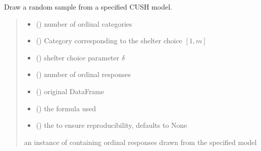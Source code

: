 \documentclass[letterpaper,10pt,english]{sphinxmanual}
\begin{document}
\begin{fulllineitems}
\label{\detokenize{cubmods:cubmods.cush.draw}}
\pysigstartsignatures
{}
\pysigstopsignatures
\sphinxAtStartPar
Draw a random sample from a specified CUSH model.
\begin{quote}\begin{description}
\begin{itemize}
\item {} 
\sphinxAtStartPar
{} () \textendash{} number of ordinal categories

\item {} 
\sphinxAtStartPar
{} () \textendash{} Category corresponding to the shelter choice \([1,m]\)

\item {} 
\sphinxAtStartPar
{} () \textendash{} shelter choice parameter \(\delta\)

\item {} 
\sphinxAtStartPar
{} () \textendash{} number of ordinal responses

\item {} 
\sphinxAtStartPar
{} () \textendash{} original DataFrame

\item {} 
\sphinxAtStartPar
{} () \textendash{} the formula used

\item {} 
\sphinxAtStartPar
{} (\sphinxstyleliteralemphasis{\sphinxupquote{, }}) \textendash{} the  to ensure reproducibility, defaults to None

\end{itemize}

\sphinxAtStartPar
an instance of  containing ordinal responses drawn from the specified model

\end{description}\end{quote}

\end{fulllineitems}
\end{document}
